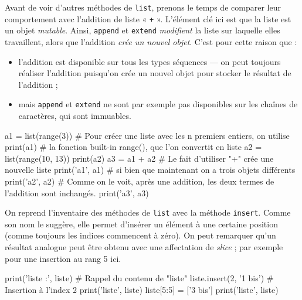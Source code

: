 
Avant de voir d'autres méthodes de \texttt{list}, prenons le temps de comparer leur comportement avec l'addition de liste « \texttt{+} ». L'élément clé ici  est que la liste est un objet \emph{mutable}. Ainsi, \texttt{append} et \texttt{extend} \emph{modifient} la liste sur laquelle elles travaillent, alors que l'addition \emph{crée un nouvel objet}. C'est pour cette raison que :
\vspace{-1pt}
\begin{itemize}
\item l'addition est disponible sur tous les types séquences --- on peut toujours réaliser l'addition puisqu'on crée un nouvel objet pour stocker le résultat de l'addition ;
\item mais \texttt{append} et \texttt{extend} ne sont par exemple pas disponibles sur les chaînes de caractères, qui sont immuables.
\end{itemize}

\vspace{-1pt}

\begin{idleconsole*}
\begin{pyconsole}[][breaklines]
a1 = list(range(3)) # Pour créer une liste avec les n premiers entiers, on utilise
print(a1)           # la fonction built-in range(), que l'on convertit en liste
a2 = list(range(10, 13))
print(a2)
a3 = a1 + a2    # Le fait d'utiliser "+" crée une nouvelle liste
print('a1', a1) # si bien que maintenant on a trois objets différents
print('a2', a2) # Comme on le voit, après une addition, les deux termes de l'addition sont inchangés.
print('a3', a3)
\end{pyconsole}
\end{idleconsole*}

\vspace{-1pt}

On reprend l'inventaire des méthodes de \texttt{list} avec la méthode \texttt{insert}. Comme son nom le suggère, elle permet d'insérer un élément à une certaine position (comme toujours les indices commencent à zéro). On peut remarquer qu'un résultat analogue peut être obtenu avec une affectation de \textit{slice} ; par exemple pour une insertion au rang 5 ici.

\vspace{-1pt}

\begin{idleconsole}
\begin{pyconsole}
print('liste :', liste) # Rappel du contenu de "liste"
liste.insert(2, '1 bis') # Insertion à l'index 2
print('liste', liste)
liste[5:5] = ['3 bis']
print('liste', liste)
\end{pyconsole}
\end{idleconsole}

